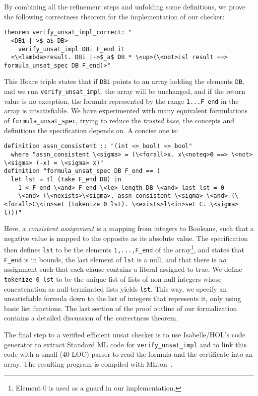 \documentclass{llncs}
\newcommand{\isai}{\lstinline[language=isabelle,basicstyle=\normalsize\ttfamily\slshape]}
\begin{document}
By combining all the refinement steps and unfolding some definitions, we prove the following correctness theorem for the implementation of our checker:
\begin{lstlisting}
theorem verify_unsat_impl_correct: "
  <DBi |->$_a$ DB> 
    verify_unsat_impl DBi F_end it 
  <\<lambda>result. DBi |->$_a$ DB * \<up>(\<not>isl result ==> formula_unsat_spec DB F_end)>"
\end{lstlisting}
This Hoare triple states that if \isai$DBi$ points to an array holding the elements \isai$DB$,
and we run \isai$verify_unsat_impl$, the array will be unchanged, and if the return value is no exception,
the formula represented by the range \isai$1...F_end$ in the array is unsatisfiable. 
We have experimented with many equivalent formulations of \isai{formula_unsat_spec}, trying to reduce the \emph{trusted base}, 
\ie the concepts and definitions the specification depends on. A concise one is:
\begin{lstlisting}
definition assn_consistent :: "(int => bool) => bool"
  where "assn_consistent \<sigma> = (\<forall>x. x\<noteq>0 ==> \<not> \<sigma> (-x) = \<sigma> x)"
definition "formula_unsat_spec DB F_end == (
  let lst = tl (take F_end DB) in
    1 < F_end \<and> F_end \<le> length DB \<and> last lst = 0 
    \<and> (\<nexists>\<sigma>. assn_consistent \<sigma> \<and> (\<forall>C\<in>set (tokenize 0 lst). \<exists>l\<in>set C. \<sigma> l)))"
\end{lstlisting}
Here, a \emph{consistent assignment} is a mapping from integers to Booleans, such that a negative value is mapped to the opposite as its absolute value.
The specification then defines \isai$lst$ to be the elements \isai$1,...,F_end$ of the array\footnote{Element $0$ is used as a guard in our implementation.}, and
states that \isai$F_end$ is in bounds, the last element of \isai$lst$ is a null, and that there is \emph{no} assignment such that each clause contains a literal assigned to true. 
We define \isai{tokenize 0 lst} to be the unique list of lists of non-null integers whose concatenation as null-terminated lists yields \isai{lst}.
This way, we specify an unsatisfiable formula down to the list of integers that represents it, only using basic list functions. 
The last section of the proof outline of our formalization~\cite{GRATchk-proof-outline} contains a detailed discussion of the correctness theorem.

The final step to a verified efficient unsat checker is to use Isabelle/HOL's code generator to extract Standard ML code for \isai{verify_unsat_impl} and to
link this code with a small (40 LOC) parser to read the formula and the certificate into an array. The resulting program is compiled with MLton~\cite{MLton}.
\end{document}
